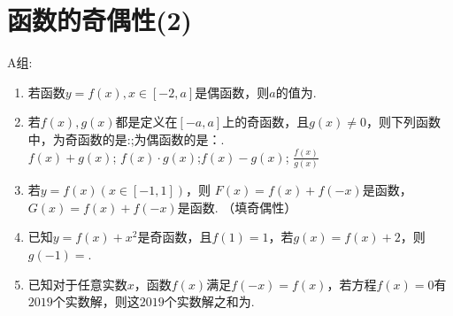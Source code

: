 \section{函数的奇偶性(2)}

A组:
\begin{enumerate}
\item 若函数$y=f(x),x\in [-2,a]$是偶函数，则$a$的值为.

\item 若$f(x),g(x)$都是定义在$[-a,a]$上的奇函数，且$g(x) \neq 0$，则下列函数中，为奇函数的是:;为偶函数的是：. \\
$f(x)+g(x)$;  $f(x)\cdot g(x)$;$f(x)-g(x)$; $\frac{f(x)}{g(x)}$

\item 若$y=f(x) (x\in [-1,1])$，则 $F(x)=f(x)+f(-x)$是函数，$G(x)=f(x)+f(-x)$是函数. （填奇偶性）

\item 已知$y=f(x)+x^2$是奇函数，且$f(1)=1$，若$g(x)=f(x)+2$，则$g(-1)=$.

\item 已知对于任意实数$x$，函数$f(x)$满足$f(-x)=f(x)$，若方程$f(x)=0$有$2019$个实数解，则这$2019$个实数解之和为.

    
\end{enumerate}


